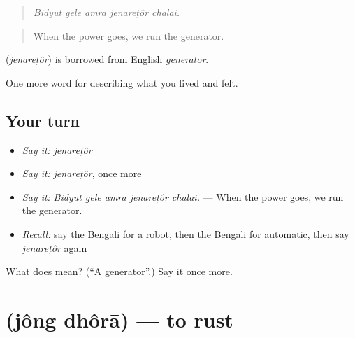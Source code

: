 \begin{quote}
    
\end{quote}

\begin{quote}
\emph{Bidyut gele āmrā jenāreṭôr chālāi.}
\end{quote}

\begin{quote}
When the power goes, we run the generator.
\end{quote}

\begin{cousinweb}
\textbf{} (\emph{jenāreṭôr}) is borrowed from English \emph{generator}.
\end{cousinweb}

\begin{grammarlens}[title={What you've built}]
One more word for describing what you lived and felt.
\end{grammarlens}

\subsection*{Your turn}
\begin{itemize}
\raggedright
  \item \emph{Say it:} \emph{jenāreṭôr}
  \item \emph{Say it:} \emph{jenāreṭôr}, once more
  \item \emph{Say it:} \emph{Bidyut gele āmrā jenāreṭôr chālāi.} — When the power goes, we run the generator.
  \item \emph{Recall:} say the Bengali for a robot, then the Bengali for automatic, then say \emph{jenāreṭôr} again
\end{itemize}

\begin{tcolorbox}[breakable,colback=teal!4,colframe=teal!35!black,title={Before you move on}]
What does  mean? (\textquotedblleft{}A generator\textquotedblright{}.) Say it once more.
\end{tcolorbox}
\section[\texorpdfstring{\bn{জং} \bn{ধরা} (jông dhôrā)}{জং ধরা (jông dhôrā)}]{  (jông dhôrā) — to rust}

\label{lesson:BN-C504-jong-dhora}




